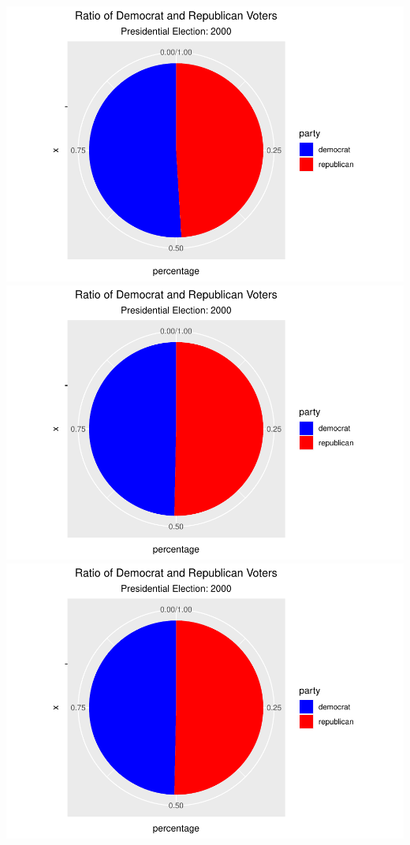 \documentclass[
]{article}
\begin{document}
\includegraphics{election_files/figure-latex/anim-55.pdf}
\includegraphics{election_files/figure-latex/anim-56.pdf}
\includegraphics{election_files/figure-latex/anim-57.pdf}
\end{document}
